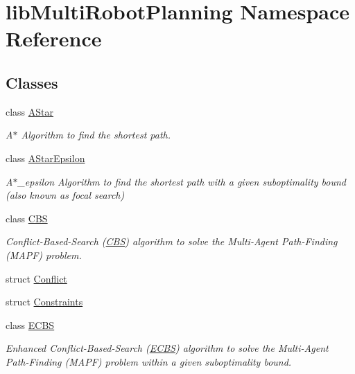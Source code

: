 \hypertarget{namespacelib_multi_robot_planning}{}\section{lib\+Multi\+Robot\+Planning Namespace Reference}
\label{namespacelib_multi_robot_planning}
\subsection*{Classes}
\begin{DoxyCompactItemize}
\item 
class \hyperlink{classlib_multi_robot_planning_1_1_a_star}{A\+Star}
\begin{DoxyCompactList}\small\item\em A$\ast$ Algorithm to find the shortest path. \end{DoxyCompactList}\item 
class \hyperlink{classlib_multi_robot_planning_1_1_a_star_epsilon}{A\+Star\+Epsilon}
\begin{DoxyCompactList}\small\item\em A$\ast$\+\_\+epsilon Algorithm to find the shortest path with a given suboptimality bound (also known as focal search) \end{DoxyCompactList}\item 
class \hyperlink{classlib_multi_robot_planning_1_1_c_b_s}{C\+BS}
\begin{DoxyCompactList}\small\item\em Conflict-\/\+Based-\/\+Search (\hyperlink{classlib_multi_robot_planning_1_1_c_b_s}{C\+BS}) algorithm to solve the Multi-\/\+Agent Path-\/\+Finding (M\+A\+PF) problem. \end{DoxyCompactList}\item 
struct \hyperlink{structlib_multi_robot_planning_1_1_conflict}{Conflict}
\item 
struct \hyperlink{structlib_multi_robot_planning_1_1_constraints}{Constraints}
\item 
class \hyperlink{classlib_multi_robot_planning_1_1_e_c_b_s}{E\+C\+BS}
\begin{DoxyCompactList}\small\item\em Enhanced Conflict-\/\+Based-\/\+Search (\hyperlink{classlib_multi_robot_planning_1_1_e_c_b_s}{E\+C\+BS}) algorithm to solve the Multi-\/\+Agent Path-\/\+Finding (M\+A\+PF) problem within a given suboptimality bound. \end{DoxyCompactList}\item 

\end{DoxyCompactItemize}
